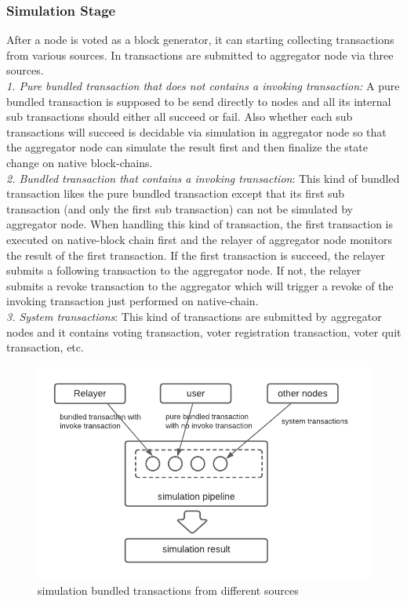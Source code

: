 \documentclass[acmtog, natbib=false]{acmart}
\begin{document}
\subsubsection{Simulation Stage}
After a node is voted as a block generator, it can starting collecting transactions from various sources. In \dprotocol transactions are submitted to aggregator node via three sources.\\
\newline
\textit{1. Pure bundled transaction that does not contains a invoking transaction:} A pure bundled transaction is supposed to be send directly to \dprotocol nodes and all its internal sub transactions should either all succeed or fail. Also whether each sub transactions will succeed is decidable via simulation in aggregator node so that the aggregator node can simulate the result first and then finalize the state change on native block-chains.\\
\newline
\textit{2. Bundled transaction that contains a invoking transaction}: This kind of bundled transaction likes the pure bundled transaction except that its first sub transaction (and only the first sub transaction) can not be simulated by aggregator node. When handling this kind of transaction, the first transaction is executed on native-block chain first and the relayer of aggregator node monitors the result of the first transaction. If the first transaction is succeed, the relayer submits a following transaction to the aggregator node. If not, the relayer submits a revoke transaction to the aggregator which will trigger a revoke of the invoking transaction just performed on native-chain.\\
\newline
\textit{3. System transactions}: This kind of transactions are submitted by aggregator nodes and it contains voting transaction, voter registration transaction, voter quit transaction, etc.

\begin{figure}[!ht]
\caption{simulation bundled transactions from different sources}
\label{simulation-stage}
\includegraphics[scale=0.6]{simulation-pipeline.png}
\end{figure}
\end{document}
